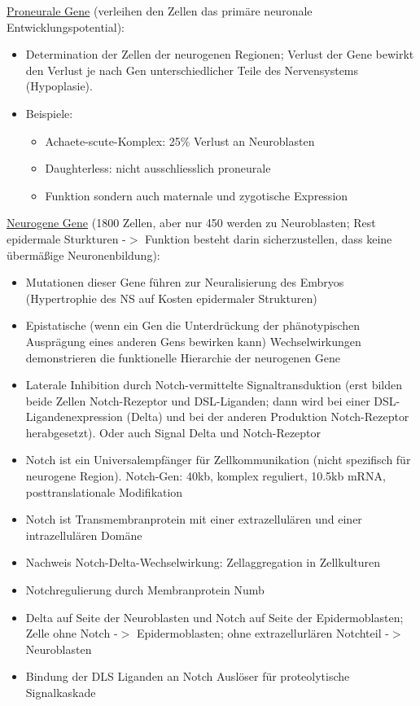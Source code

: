 \underline{Proneurale Gene} (verleihen den Zellen das primäre neuronale Entwicklungspotential):
\begin{itemize}
	\item Determination der Zellen der neurogenen Regionen; Verlust der Gene bewirkt den Verlust je nach Gen unterschiedlicher Teile des Nervensystems (Hypoplasie).
	\item Beispiele:
		\begin{itemize}
			\item Achaete-scute-Komplex: 25\% Verlust an Neuroblasten
			\item Daughterless: nicht ausschliesslich proneurale 				\item Funktion sondern auch maternale und zygotische Expression
		\end{itemize}
\end{itemize}

\underline{Neurogene Gene} (1800 Zellen, aber nur 450 werden zu Neuroblasten; Rest epidermale Sturkturen -$>$ Funktion besteht darin sicherzustellen, dass keine übermäßige Neuronenbildung):
\begin{itemize}
	\item Mutationen dieser Gene führen zur Neuralisierung des Embryos (Hypertrophie des NS auf Kosten epidermaler Strukturen)
	\item Epistatische (wenn ein Gen die Unterdrückung der phänotypischen Ausprägung eines anderen Gens bewirken kann) Wechselwirkungen demonstrieren die funktionelle Hierarchie der neurogenen Gene
	\item Laterale Inhibition durch Notch-vermittelte Signaltransduktion (erst bilden beide Zellen Notch-Rezeptor und DSL-Liganden; dann wird bei einer DSL-Ligandenexpression (Delta) und bei der anderen Produktion Notch-Rezeptor herabgesetzt). Oder auch Signal Delta und Notch-Rezeptor
	\item Notch ist ein Universalempfänger für Zellkommunikation (nicht spezifisch für neurogene Region). Notch-Gen: 40kb, komplex reguliert, 10.5kb mRNA, posttranslationale Modifikation
	\item Notch ist Transmembranprotein mit einer extrazellulären und einer intrazellulären Domäne
	\item Nachweis Notch-Delta-Wechselwirkung: Zellaggregation in Zellkulturen
	\item Notchregulierung durch Membranprotein Numb
	\item Delta auf Seite der Neuroblasten und Notch auf Seite der Epidermoblasten; Zelle ohne Notch -$>$ Epidermoblasten; ohne extrazellurlären Notchteil -$>$ Neuroblasten
	\item Bindung der DLS Liganden an Notch Auslöser für proteolytische Signalkaskade
\end{itemize}

